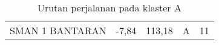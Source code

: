 \begin{table}[H]
\begin{adjustbox}{width=\columnwidth,center}
\begin{tabular}{lllcl}
SMAN   1 BANTARAN                                                                          & -7,84                                                                                          & 113,18                                                                                          & A                                       & 11                                                                                
\end{tabular}
\end{adjustbox}
\caption{Urutan perjalanan pada klaster A}
\label{tab:datahasil}
\end{table}